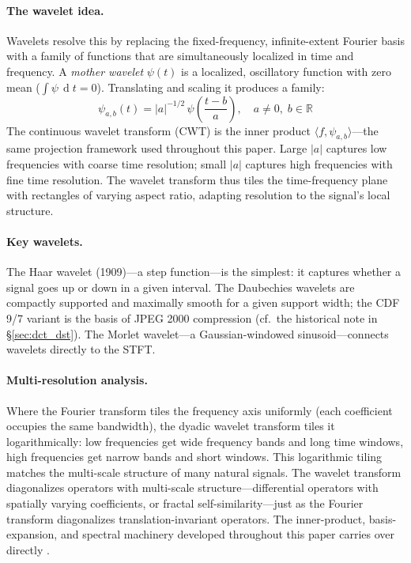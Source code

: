 \documentclass[12pt,a4paper]{report}
\DeclareMathOperator{\deriv}{d}
\theoremstyle{thms}
\theoremstyle{defns}
\begin{document}
\paragraph{The wavelet idea.} Wavelets resolve this by replacing the fixed-frequency, infinite-extent Fourier basis with a family of functions that are simultaneously localized in time and frequency. A \textit{mother wavelet} $\psi(t)$ is a localized, oscillatory function with zero mean ($\int \psi\,\deriv t = 0$). Translating and scaling it produces a family:
\begin{equation}
    \psi_{a,b}(t) = |a|^{-1/2}\,\psi\!\left(\frac{t - b}{a}\right), \quad a \neq 0,\; b \in \mathbb{R}
\end{equation}
The continuous wavelet transform (CWT) is the inner product $\langle f, \psi_{a,b} \rangle$—the same projection framework used throughout this paper. Large $|a|$ captures low frequencies with coarse time resolution; small $|a|$ captures high frequencies with fine time resolution. The wavelet transform thus tiles the time-frequency plane with rectangles of varying aspect ratio, adapting resolution to the signal's local structure.

\paragraph{Key wavelets.} The Haar wavelet (1909)—a step function—is the simplest: it captures whether a signal goes up or down in a given interval. The Daubechies wavelets \cite{daubechies1992} are compactly supported and maximally smooth for a given support width; the CDF 9/7 variant is the basis of JPEG 2000 compression (cf.\ the historical note in \S\ref{sec:dct_dst}). The Morlet wavelet—a Gaussian-windowed sinusoid—connects wavelets directly to the STFT.

\paragraph{Multi-resolution analysis.} Where the Fourier transform tiles the frequency axis uniformly (each coefficient occupies the same bandwidth), the dyadic wavelet transform tiles it logarithmically: low frequencies get wide frequency bands and long time windows, high frequencies get narrow bands and short windows. This logarithmic tiling matches the multi-scale structure of many natural signals. The wavelet transform diagonalizes operators with multi-scale structure—differential operators with spatially varying coefficients, or fractal self-similarity—just as the Fourier transform diagonalizes translation-invariant operators. The inner-product, basis-expansion, and spectral machinery developed throughout this paper carries over directly \cite{mallat2009}.
\end{document}
